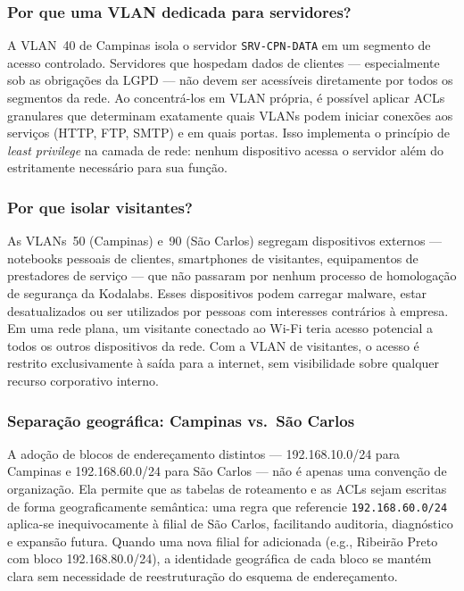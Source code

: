 \subsubsection{Por que uma VLAN dedicada para servidores?}

A VLAN~40 de Campinas isola o servidor \texttt{SRV-CPN-DATA} em um segmento
de acesso controlado. Servidores que hospedam dados de clientes — especialmente
sob as obrigações da LGPD — não devem ser acessíveis diretamente por todos os
segmentos da rede. Ao concentrá-los em VLAN própria, é possível aplicar ACLs
granulares que determinam exatamente quais VLANs podem iniciar conexões aos
serviços (HTTP, FTP, SMTP) e em quais portas. Isso implementa o princípio de
\textit{least privilege} na camada de rede: nenhum dispositivo acessa o servidor
além do estritamente necessário para sua função.

\subsubsection{Por que isolar visitantes?}

As VLANs~50 (Campinas) e~90 (São Carlos) segregam dispositivos externos —
notebooks pessoais de clientes, smartphones de visitantes, equipamentos de
prestadores de serviço — que não passaram por nenhum processo de homologação de
segurança da Kodalabs. Esses dispositivos podem carregar malware, estar
desatualizados ou ser utilizados por pessoas com interesses contrários à empresa.
Em uma rede plana, um visitante conectado ao Wi-Fi teria acesso potencial a todos
os outros dispositivos da rede. Com a VLAN de visitantes, o acesso é restrito
exclusivamente à saída para a internet, sem visibilidade sobre qualquer recurso
corporativo interno.

\subsubsection{Separação geográfica: Campinas vs.\ São Carlos}

A adoção de blocos de endereçamento distintos — 192.168.10.0/24 para Campinas e
192.168.60.0/24 para São Carlos — não é apenas uma convenção de organização. Ela
permite que as tabelas de roteamento e as ACLs sejam escritas de forma
geograficamente semântica: uma regra que referencie \texttt{192.168.60.0/24}
aplica-se inequivocamente à filial de São Carlos, facilitando auditoria, diagnóstico
e expansão futura. Quando uma nova filial for adicionada (e.g., Ribeirão Preto com
bloco 192.168.80.0/24), a identidade geográfica de cada bloco se mantém clara sem
necessidade de reestruturação do esquema de endereçamento.

